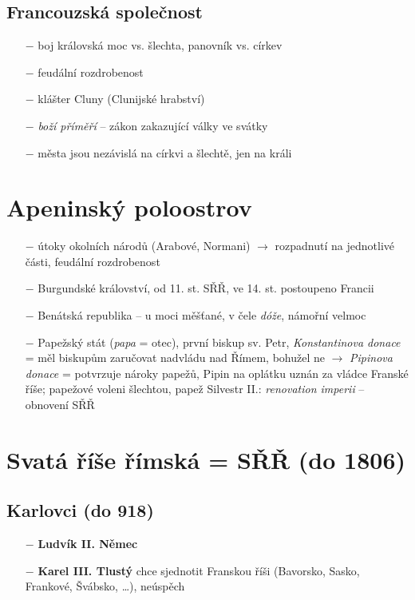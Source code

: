 \documentclass{article}
\begin{document}
\subsection*{Francouzská společnost}
\begin{itemize}
    \vspace{-0.5em}
    \setlength\itemsep{0.15em}
    \item[$-$] boj královská moc vs. šlechta, panovník vs. církev
    \item[$-$] feudální rozdrobenost
    \item[$-$] klášter Cluny (Clunijské hrabství)
    \item[$-$] \textit{boží příměří} -- zákon zakazující války ve svátky
    \item[$-$] města jsou nezávislá na církvi a šlechtě, jen na králi
\end{itemize}

\section*{Apeninský poloostrov}
\begin{itemize}
    \vspace{-0.5em}
    \setlength\itemsep{0.15em}
    \item[$-$] útoky okolních národů (Arabové, Normani) $\rightarrow$ rozpadnutí na jednotlivé části, feudální rozdrobenost
    \item[$-$] Burgundské království, od 11. st. SŘŘ, ve 14. st. postoupeno Francii
    \item[$-$] Benátská republika -- u moci měšťané, v čele \textit{dóže}, námořní velmoc
    \item[$-$] Papežský stát (\textit{papa} = otec), první biskup sv. Petr, \textit{Konstantinova donace} = měl biskupům zaručovat nadvládu nad Římem, bohužel ne $\rightarrow$ \textit{Pipinova donace} = potvrzuje nároky papežů, Pipin na oplátku uznán za vládce Franské říše; papežové voleni šlechtou, papež Silvestr II.: \textit{renovation imperii} -- obnovení SŘŘ
\end{itemize}

\section*{Svatá říše římská = SŘŘ (do 1806)}
\subsection*{Karlovci (do 918)}
\begin{itemize}
    \vspace{-0.5em}
    \setlength\itemsep{0.15em}
    \item[$-$] \textbf{Ludvík II. Němec}
    \item[$-$] \textbf{Karel III. Tlustý} chce sjednotit Franskou říši (Bavorsko, Sasko, Frankové, Švábsko, \dots), neúspěch
\end{itemize}
\end{document}
